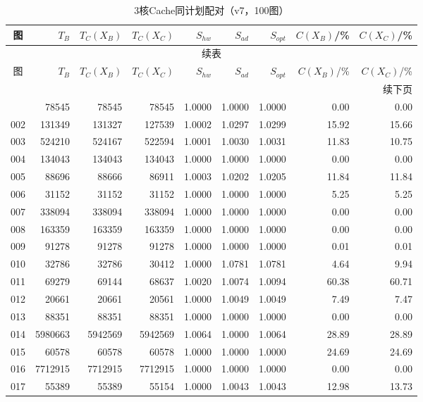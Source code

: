 \begin{longtable}{crrrrrrrr}
\caption{3核Cache同计划配对（v7，100图）}\label{tab:cache-detail-3}\\
\toprule
图 & $T_B$ & $T_C(X_B)$ & $T_C(X_C)$ & $S_{hw}$ & $S_{ad}$ & $S_{opt}$ & $C(X_B)$/\% & $C(X_C)$/\% \\
\midrule
\endfirsthead
\multicolumn{9}{c}{续表}\\
\toprule
图 & $T_B$ & $T_C(X_B)$ & $T_C(X_C)$ & $S_{hw}$ & $S_{ad}$ & $S_{opt}$ & $C(X_B)$/\% & $C(X_C)$/\% \\
\midrule
\endhead
\midrule\multicolumn{9}{r}{续下页}\\
\endfoot
\bottomrule
\endlastfoot
001 & 78545 & 78545 & 78545 & 1.0000 & 1.0000 & 1.0000 & 0.00 & 0.00 \\
002 & 131349 & 131327 & 127539 & 1.0002 & 1.0297 & 1.0299 & 15.92 & 15.66 \\
003 & 524210 & 524167 & 522594 & 1.0001 & 1.0030 & 1.0031 & 11.83 & 10.75 \\
004 & 134043 & 134043 & 134043 & 1.0000 & 1.0000 & 1.0000 & 0.00 & 0.00 \\
005 & 88696 & 88666 & 86911 & 1.0003 & 1.0202 & 1.0205 & 11.84 & 11.84 \\
006 & 31152 & 31152 & 31152 & 1.0000 & 1.0000 & 1.0000 & 5.25 & 5.25 \\
007 & 338094 & 338094 & 338094 & 1.0000 & 1.0000 & 1.0000 & 0.00 & 0.00 \\
008 & 163359 & 163359 & 163359 & 1.0000 & 1.0000 & 1.0000 & 0.00 & 0.00 \\
009 & 91278 & 91278 & 91278 & 1.0000 & 1.0000 & 1.0000 & 0.01 & 0.01 \\
010 & 32786 & 32786 & 30412 & 1.0000 & 1.0781 & 1.0781 & 4.64 & 9.94 \\
011 & 69279 & 69144 & 68637 & 1.0020 & 1.0074 & 1.0094 & 60.38 & 60.71 \\
012 & 20661 & 20661 & 20561 & 1.0000 & 1.0049 & 1.0049 & 7.49 & 7.47 \\
013 & 88351 & 88351 & 88351 & 1.0000 & 1.0000 & 1.0000 & 0.00 & 0.00 \\
014 & 5980663 & 5942569 & 5942569 & 1.0064 & 1.0000 & 1.0064 & 28.89 & 28.89 \\
015 & 60578 & 60578 & 60578 & 1.0000 & 1.0000 & 1.0000 & 24.69 & 24.69 \\
016 & 7712915 & 7712915 & 7712915 & 1.0000 & 1.0000 & 1.0000 & 0.00 & 0.00 \\
017 & 55389 & 55389 & 55154 & 1.0000 & 1.0043 & 1.0043 & 12.98 & 13.73 \\

\end{longtable}
